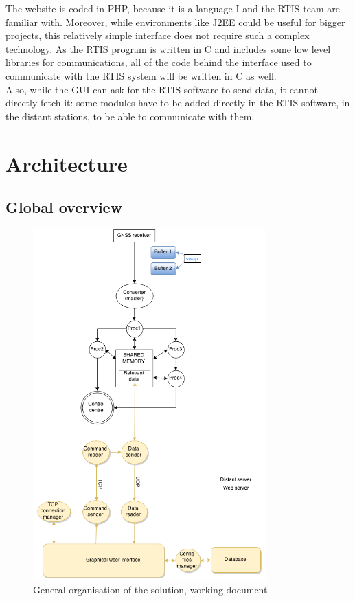\documentclass{themeensg}
\begin{document}
The website is coded in PHP, because it is a language I and the RTIS team are familiar with. Moreover, while environments like J2EE could be useful for bigger projects, this relatively simple interface does not require such a complex technology.
As the RTIS program is written in C and includes some low level libraries for communications, all of the code behind the interface used to communicate with the RTIS system will be written in C as well.\\

Also, while the GUI can ask for the RTIS software to send data, it cannot directly fetch it: some modules have to be added directly in the RTIS software, in the distant stations, to be able to communicate with them.

\section{Architecture}
\subsection{Global overview}

\begin{figure}[!hb]
	\centering
	\includegraphics[width=0.8\textwidth]{global_flowchart}
	\caption{General organisation of the solution, working document}
	\label{generalOrganisation}
\end{figure}
\end{document}
